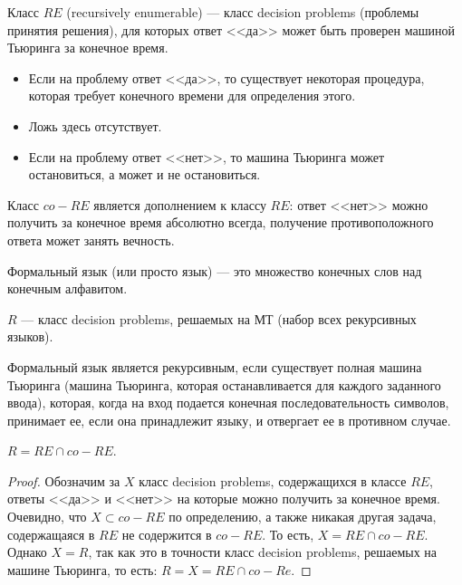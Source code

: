     \begin{Def}[Классы $RE$ и $co-RE$]
        Класс $RE$ (recursively enumerable) --- класс decision problems (проблемы принятия решения), для которых ответ <<да>> может быть проверен машиной Тьюринга за конечное время.
        \begin{itemize}
            \item Если на проблему ответ <<да>>, то существует некоторая процедура, которая требует конечного времени для определения этого.
            \item Ложь здесь отсутствует.
            \item Если на проблему ответ <<нет>>, то машина Тьюринга может остановиться, а может и не остановиться.
        \end{itemize}
        Класс $co-RE$ является дополнением к классу $RE$: ответ <<нет>> можно получить за конечное время абсолютно всегда, получение противоположного ответа может занять вечность.
    \end{Def}
    \begin{Def}
        Формальный язык (или просто язык) --- это множество конечных слов над конечным алфавитом.
    \end{Def}
    \begin{Def}[Класс $R$]
        $R$ --- класс decision problems, решаемых на МТ (набор всех рекурсивных языков). 
    \end{Def}
    \begin{Def} 
        Формальный язык является рекурсивным, если существует полная машина Тьюринга (машина Тьюринга, которая останавливается для каждого заданного ввода), которая, когда на вход подается конечная последовательность символов, принимает ее, если она принадлежит языку, и отвергает ее в противном случае. 
    \end{Def}
    \begin{Thm}
        $R = RE \cap co-RE$.
    \end{Thm}
    \begin{proof}
        Обозначим за $X$ класс decision problems, содержащихся в классе $RE$, ответы <<да>> и <<нет>> на которые можно получить за конечное время. Очевидно, что $X \subset co-RE$ по определению, а также никакая другая задача, содержащаяся в $RE$ не содержится в $co-RE$. То есть, $X = RE \cap co-RE$. Однако $X = R$, так как это в точности класс decision problems, решаемых на машине Тьюринга, то есть: $R = X = RE \cap co-Re$.
    \end{proof}
    
